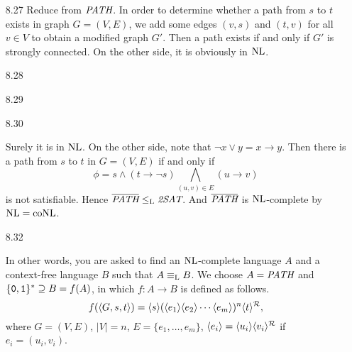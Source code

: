 \begin{itemize}
	\item[8.27]
	Reduce from $\IT{PATH}$. In order to determine whether a path from $s$ to $t$ exists in graph $G = (V, E)$, we add some edges $(v, s)$ and $(t, v)$ for all $v \in V$ to obtain a modified graph $G'$. Then a path exists if and only if $G'$ is strongly connected. On the other side, it is obviously in $\RM{NL}$.
	
	\item[8.28]
	\Empty
	
	\item[8.29]
	\Empty
	
	\item[8.30]
	\Empty
		
	\item[\Star 8.31]
	Surely it is in $\RM{NL}$. On the other side, note that $\neg x \vee y = x \to y$. Then there is a path from $s$ to $t$ in $G = (V, E)$ if and only if
	$$
		\phi = s \wedge (t \to \neg s) \bigwedge_{(u, v) \in E} (u \to v)
	$$
	is not satisfiable. Hence $\overline{\IT{PATH}} \leq_{\RM{L}} \IT{2SAT}$. And $\overline{\IT{PATH}}$ is $\RM{NL}$-complete by $\RM{NL} = \RM{coNL}$.
	
	\item[8.32]
	\Empty
	
	\item[\Star 8.33] 
	In other words, you are asked to find an $\RM{NL}$-complete language $A$ and a context-free language $B$ such that $A \equiv_{\RM{L}} B$. We choose $A = \IT{PATH}$ and $\{\TT{0}, \TT{1}\}^* \supseteq B = f(A)$, in which $f: A \to B$ is defined as follows.
	$$
		f(\Bra{G, s, t}) = \Bra{s}(\Bra{e_1} \Bra{e_2} \cdots \Bra{e_m} )^n\Bra{t}^{\mathcal{R}},
	$$
	where $G = (V, E)$, $|V| = n$, $E = \{e_1, \dots, e_m\}$, $\Bra{e_i} = \Bra{u_i}\Bra{v_i}^{\mathcal{R}}$ if $e_i = (u_i, v_i)$.
	
	\item[\Star 8.34] 
	\Omit
	
\end{itemize}